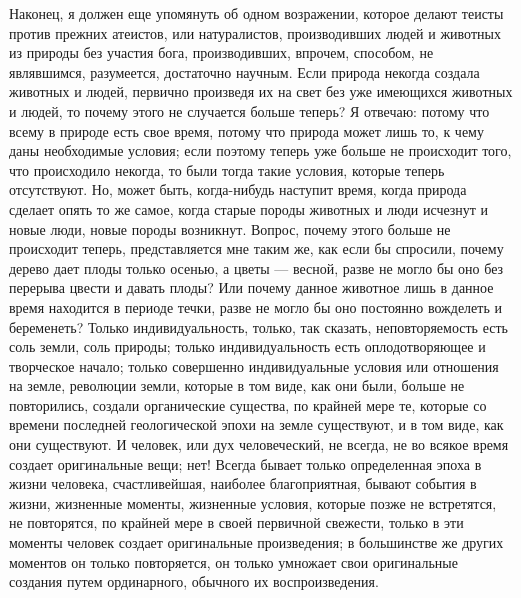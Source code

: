 \documentclass[12pt]{article}
\begin{document}
Наконец, я должен еще упомянуть об одном возражении, которое делают теисты против прежних атеистов, или натуралистов, производивших людей и животных из природы без участия бога, производивших, впрочем, способом, не являвшимся, разумеется, достаточно научным. Если природа некогда создала животных и людей, первично произведя их на свет без уже имеющихся животных и людей, то почему этого не случается больше теперь? Я отвечаю: потому что всему в природе есть свое время, потому что природа может лишь то, к чему даны необходимые условия; если поэтому теперь уже больше не происходит того, что происходило некогда, то были тогда такие условия, которые теперь отсутствуют. Но, может быть, когда-нибудь наступит время, когда природа сделает опять то же самое, когда старые породы животных и люди исчезнут и новые люди, новые породы возникнут. Вопрос, почему этого больше не происходит теперь, представляется мне таким же, как если бы спросили, почему дерево дает плоды только осенью, а цветы --- весной, разве не могло бы оно без перерыва цвести и давать плоды? Или почему данное животное лишь в данное время находится в периоде течки, разве не могло бы оно постоянно вожделеть и беременеть? Только индивидуальность, только, так сказать, неповторяемость есть соль земли, соль природы; только индивидуальность есть оплодотворяющее и творческое начало; только совершенно индивидуальные условия или отношения на земле, революции земли, которые в том виде, как они были, больше не повторились, создали органические существа, по крайней мере те, которые со времени последней геологической эпохи на земле существуют, и в том виде, как они существуют. И человек, или дух человеческий, не всегда, не во всякое время создает оригинальные вещи; нет! Всегда бывает только определенная эпоха в жизни человека, счастливейшая, наиболее благоприятная, бывают события в жизни, жизненные моменты, жизненные условия, которые позже не встретятся, не повторятся, по крайней мере в своей первичной свежести, только в эти моменты человек создает оригинальные произведения; в большинстве же других моментов он только повторяется, он только умножает свои оригинальные создания путем ординарного, обычного их воспроизведения. 
\end{document}
